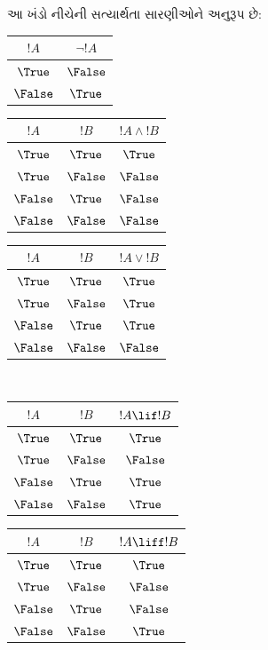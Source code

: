 \begin{explain}
આ ખંડો નીચેની સત્યાર્થતા સારણીઓને અનુરૂપ છે:
\begin{center}
  \begin{tabular}{|c||c|} \hline
    $!A$ & $ \lnot !A$ \\
    \hline \hline
    $\True$ & $\False$ \\
    $\False$ & $\True$ \\
    \hline
  \end{tabular}
  \begin{tabular}{|cc||c|} \hline
    $!A$ & $!B$ & $!A \land !B$ \\
    \hline \hline
    $\True$ & $\True$ & $\True$ \\
    $\True$ & $\False$ & $\False$ \\
    $\False$ & $\True$ & $\False$ \\
    $\False$ & $\False$ & $\False$ \\
    \hline
  \end{tabular}
  \begin{tabular}{|cc||c|} \hline
    $!A$ & $!B$ & $!A \lor !B$ \\
    \hline \hline
    $\True$ & $\True$ & $\True$ \\
    $\True$ & $\False$ & $\True$ \\
    $\False$ & $\True$ & $\True$ \\
    $\False$ & $\False$ & $\False$ \\
    \hline
  \end{tabular}
%
\\[1em]
  \begin{tabular}{|cc||c|} \hline
    $!A$ & $!B$ & $!A \lif !B$ \\
    \hline \hline
    $\True$ & $\True$ & $\True$ \\
    $\True$ & $\False$ & $\False$ \\
    $\False$ & $\True$ & $\True$ \\
    $\False$ & $\False$ & $\True$ \\
    \hline
  \end{tabular}
  \begin{tabular}{|cc||c|} \hline
    $!A$ & $!B$ & $!A \liff !B$ \\
    \hline \hline
    $\True$ & $\True$ & $\True$ \\
    $\True$ & $\False$ & $\False$ \\
    $\False$ & $\True$ & $\False$ \\
    $\False$ & $\False$ & $\True$ \\
    \hline
  \end{tabular}
\end{center}
\end{explain}

